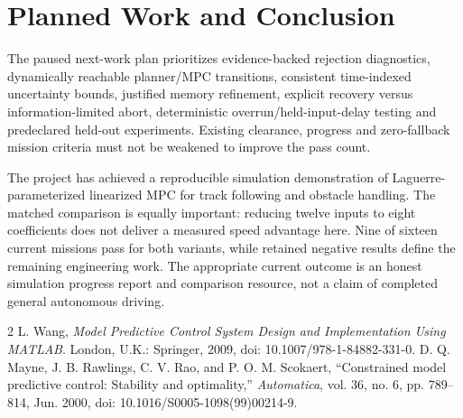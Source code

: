 \documentclass[conference]{IEEEtran}
\begin{document}
\section{Planned Work and Conclusion}
The paused next-work plan prioritizes evidence-backed rejection diagnostics,
dynamically reachable planner/MPC transitions, consistent time-indexed
uncertainty bounds, justified memory refinement, explicit recovery versus
information-limited abort, deterministic overrun/held-input-delay testing and
predeclared held-out experiments. Existing clearance, progress and zero-fallback
mission criteria must not be weakened to improve the pass count.

The project has achieved a reproducible simulation demonstration of
Laguerre-parameterized linearized MPC for track following and obstacle handling.
The matched comparison is equally important: reducing twelve inputs to eight
coefficients does not deliver a measured speed advantage here. Nine of sixteen
current missions pass for both variants, while retained negative results define
the remaining engineering work. The appropriate current outcome is an honest
simulation progress report and comparison resource, not a claim of completed
general autonomous driving.

\begin{thebibliography}{2}
L. Wang, \emph{Model Predictive Control System Design and Implementation Using
MATLAB}. London, U.K.: Springer, 2009, doi: 10.1007/978-1-84882-331-0.
D. Q. Mayne, J. B. Rawlings, C. V. Rao, and P. O. M. Scokaert,
``Constrained model predictive control: Stability and optimality,''
\emph{Automatica}, vol. 36, no. 6, pp. 789--814, Jun. 2000,
doi: 10.1016/S0005-1098(99)00214-9.
\end{thebibliography}
\end{document}
